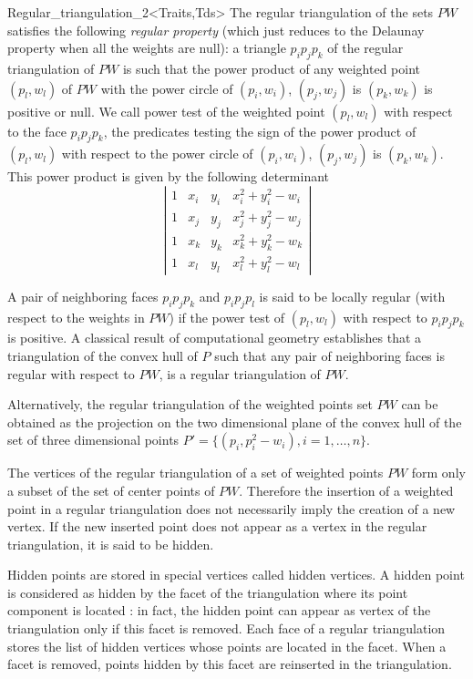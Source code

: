 \begin{ccRefClass}{Regular_triangulation_2<Traits,Tds>}
The regular triangulation of the sets ${  PW}$
satisfies the following {\em regular property} (which just reduces to the 
Delaunay property when all the weights are null):
a triangle $p_ip_jp_k$ of the regular triangulation
of ${  PW}$ is such that the power product of any weighted point
 $(p_l, w_l)$ of ${  PW}$ with the power circle of
 $(p_i, w_i)$, $(p_j, w_j)$ is $(p_k, w_k)$ is positive or null.
We call  power test of the weighted point $(p_l, w_l)$ with respect
to the face  $p_ip_jp_k$, the predicates testing
the sign of 
the power product of $(p_l, w_l)$ with respect to
the power circle of
 $(p_i, w_i)$, $(p_j, w_j)$ is $(p_k, w_k)$. This power product
is given by the following
determinant
\[\left| \begin{array}{cccc}
1  &  x_i  &  y_i  &  x_i ^2 + y_i ^2 - w_i  \\
1  &  x_j  &  y_j  &  x_j ^2 + y_j ^2 - w_j  \\
1  &  x_k  &  y_k  &  x_k ^2 + y_k ^2 - w_k  \\
1  &  x_l  &  y_l  &  x_l ^2 + y_l ^2 - w_l
\end{array}
\right|
\]

A pair of neighboring faces $p_ip_jp_k$
and $p_ip_jp_l$ is said to be locally regular
(with respect to  the weights in ${  PW}$)
if the power test of $(p_l,w_l)$ with respect to
$p_ip_jp_k$ is positive.
A classical  result of computational geometry
establishes that a triangulation of the convex hull of ${  P}$
such that any pair of neighboring faces is regular with respect
to ${  PW}$, is a
 regular triangulation of ${  PW}$.

Alternatively, the regular triangulation
of the weighted points set ${  PW}$
can be obtained as the projection
on the two dimensional plane of the convex hull of the set of three
dimensional points 
${  P'}= \{ (p_i,p_i ^2 - w_i ), i = 1, \ldots , n \}$.

The vertices of the regular triangulation
of a set of weighted points ${  PW}$ form only a subset
of the set of center points of ${   PW}$.
Therefore the  insertion of a weighted point  in a regular triangulation
does not necessarily imply the creation of a new vertex.
If the new inserted point does not appear as a vertex in the
regular triangulation, it is said to be hidden. 

Hidden points
are  stored in special vertices called hidden vertices.
A hidden point is considered as hidden by
the facet of the triangulation where its point component is located :
in fact, the hidden point 
can appear as vertex of the triangulation
only if this facet is removed.
Each  face of a regular triangulation stores
the list of hidden vertices whose points are located in the facet.
When a facet is removed, 
points hidden by this facet are reinserted in the triangulation.






\end{ccRefClass}

